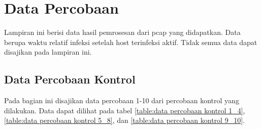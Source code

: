 \chapter{Data Percobaan}

Lampiran ini berisi data hasil pemrosesan dari pcap yang didapatkan. Data berupa waktu relatif infeksi setelah host terinfeksi aktif. Tidak semua data dapat disajikan pada lampiran ini.

\section{Data Percobaan Kontrol}

Pada bagian ini disajikan data percobaan 1-10 dari percobaan kontrol yang dilakukan. Data dapat dilihat pada tabel \ref{table:data percobaan kontrol 1_4}, \ref{table:data percobaan kontrol 5_8}, dan \ref{table:data percobaan kontrol 9_10}.

